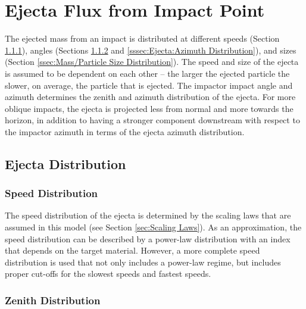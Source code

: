 \documentclass{article}
\begin{document}
\section{Ejecta Flux from Impact Point}\label{sec:Secondary Flux Environment}

The ejected mass from an impact is distributed at different speeds (Section \ref{sssec:Ejecta:Speed Distribution}), angles (Sections  \ref{sssec:Ejecta:Zenith Distribution} and \ref{sssec:Ejecta:Azimuth Distribution}), and sizes (Section \ref{ssec:Mass/Particle Size Distribution}). The speed and size of the ejecta is assumed to be dependent on each other -- the larger the ejected particle the slower, on average, the particle that is ejected. The impactor impact angle and azimuth determines the zenith and azimuth distribution of the ejecta. For more oblique impacts, the ejecta is projected less from normal and more towards the horizon, in addition to having a stronger component downstream with respect to the impactor azimuth in terms of the ejecta azimuth distribution. 



\subsection{Ejecta Distribution}\label{ssec:Ejecta Distribution}




\subsubsection{Speed Distribution}\label{sssec:Ejecta:Speed Distribution}

The speed distribution of the ejecta is determined by the scaling laws \citep{housen2011ejecta} that are assumed in this model (see Section \ref{sec:Scaling Laws}). As an approximation, the speed distribution can be described by a power-law distribution with an index that depends on the target material. However, a more complete speed distribution is used that not only includes a power-law regime, but includes proper cut-offs for the slowest speeds and fastest speeds.%


\subsubsection{Zenith Distribution}\label{sssec:Ejecta:Zenith Distribution}
\end{document}

